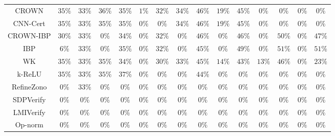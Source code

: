 \begin{table*}
{\begin{tabular}{c|c|c|c|c|c|c|c|c|c|c|c|c|c|c}
        CROWN &        $35\%$ &        $33\%$ &        $36\%$ &        $35\%$ &         $1\%$ &        $32\%$ &        $34\%$ &        $46\%$ &        $19\%$ &        $45\%$ &         $0\%$ &         $0\%$ &         $0\%$ &         $0\%$ \\
     CNN-Cert &        $35\%$ &        $33\%$ &        $35\%$ &        $35\%$ &         $0\%$ &         $0\%$ &        $34\%$ &        $46\%$ &        $19\%$ &        $45\%$ &         $0\%$ &         $0\%$ &         $0\%$ &         $0\%$ \\
    CROWN-IBP &        $30\%$ &        $33\%$ &         $0\%$ &        $34\%$ &         $0\%$ &        $32\%$ &         $0\%$ &        $46\%$ &         $0\%$ &        $46\%$ &         $0\%$ &        $50\%$ &         $0\%$ &        $47\%$ \\
          IBP &         $6\%$ &        $33\%$ &         $0\%$ &        $35\%$ &         $0\%$ &        $32\%$ &         $0\%$ &        $45\%$ &         $0\%$ &        $49\%$ &         $0\%$ &        $51\%$ &         $0\%$ &        $51\%$ \\
           WK &        $35\%$ &        $33\%$ &        $35\%$ &        $34\%$ &         $0\%$ &        $30\%$ &        $33\%$ &        $45\%$ &        $14\%$ &        $43\%$ &        $13\%$ &        $46\%$ &         $0\%$ &        $23\%$ \\
       k-ReLU &        $35\%$ &        $33\%$ &        $35\%$ &        $37\%$ &         $0\%$ &         $0\%$ &         $0\%$ &        $44\%$ &         $0\%$ &         $0\%$ &         $0\%$ &         $0\%$ &         $0\%$ &         $0\%$ \\
   RefineZono &         $0\%$ &        $33\%$ &         $0\%$ &         $0\%$ &         $0\%$ &         $0\%$ &         $0\%$ &         $0\%$ &         $0\%$ &         $0\%$ &         $0\%$ &         $0\%$ &         $0\%$ &         $0\%$ \\
    SDPVerify &         $0\%$ &         $0\%$ &         $0\%$ &         $0\%$ &         $0\%$ &         $0\%$ &         $0\%$ &         $0\%$ &         $0\%$ &         $0\%$ &         $0\%$ &         $0\%$ &         $0\%$ &         $0\%$ \\
    LMIVerify &         $0\%$ &         $0\%$ &         $0\%$ &         $0\%$ &         $0\%$ &         $0\%$ &         $0\%$ &         $0\%$ &         $0\%$ &         $0\%$ &         $0\%$ &         $0\%$ &         $0\%$ &         $0\%$ \\
      Op-norm &         $0\%$ &         $0\%$ &         $0\%$ &         $0\%$ &         $0\%$ &         $0\%$ &         $0\%$ &         $0\%$ &         $0\%$ &         $0\%$ &         $0\%$ &         $0\%$ &         $0\%$ &         $0\%$ \\

\end{tabular}}
\end{table*}
